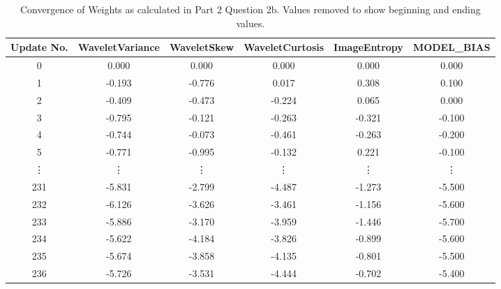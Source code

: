 \documentclass[12pt, fullpage,letterpaper]{article}
\begin{document}
\begin{enumerate}
\begin{table}[h]
	\centering
	\begin{tabular}{cccccc}
        {Update No.} & {WaveletVariance} & {WaveletSkew} & {WaveletCurtosis} & {ImageEntropy} & {MODEL\_BIAS} \\
        \hline\hline
        0 & 0.000 & 0.000 & 0.000 & 0.000 & 0.000 \\ \hline
        1 & -0.193 & -0.776 & 0.017 & 0.308 & 0.100 \\ \hline
        2 & -0.409 & -0.473 & -0.224 & 0.065 & 0.000 \\ \hline
        3 & -0.795 & -0.121 & -0.263 & -0.321 & -0.100 \\ \hline
        4 & -0.744 & -0.073 & -0.461 & -0.263 & -0.200 \\ \hline
        5 & -0.771 & -0.995 & -0.132 & 0.221 & -0.100 \\ \hline
        \vdots & \vdots & \vdots & \vdots & \vdots & \vdots \\ \hline
        231 & -5.831 & -2.799 & -4.487 & -1.273 & -5.500 \\ \hline
        232 & -6.126 & -3.626 & -3.461 & -1.156 & -5.600 \\ \hline
        233 & -5.886 & -3.170 & -3.959 & -1.446 & -5.700 \\ \hline
        234 & -5.622 & -4.184 & -3.826 & -0.899 & -5.600 \\ \hline
        235 & -5.674 & -3.858 & -4.135 & -0.801 & -5.500 \\ \hline
        236 & -5.726 & -3.531 & -4.444 & -0.702 & -5.400 \\ \hline
    \end{tabular}
	\caption{Convergence of Weights as calculated in Part 2 Question 2b. Values removed to show beginning and ending values.}
\end{table}

\end{enumerate}
\end{document}
